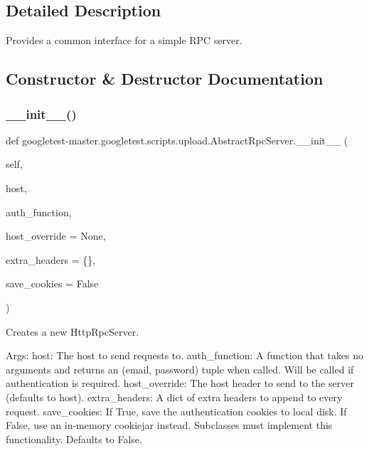 \subsection{Detailed Description}
\begin{DoxyVerb}Provides a common interface for a simple RPC server.\end{DoxyVerb}
 

\subsection{Constructor \& Destructor Documentation}
\mbox{\label{classgoogletest-master_1_1googletest_1_1scripts_1_1upload_1_1_abstract_rpc_server_ab7c84aa7f8f377b98188c9120cfcc355}} 
\subsubsection{\texorpdfstring{\_\_init\_\_()}{\_\_init\_\_()}}
{\footnotesize\ttfamily def googletest-\/master.\+googletest.\+scripts.\+upload.\+Abstract\+Rpc\+Server.\+\_\+\+\_\+init\+\_\+\+\_\+ (\begin{DoxyParamCaption}\item[{}]{self,  }\item[{}]{host,  }\item[{}]{auth\+\_\+function,  }\item[{}]{host\+\_\+override = {\ttfamily None},  }\item[{}]{extra\+\_\+headers = {\ttfamily \{\}},  }\item[{}]{save\+\_\+cookies = {\ttfamily False} }\end{DoxyParamCaption})}

\begin{DoxyVerb}Creates a new HttpRpcServer.

Args:
  host: The host to send requests to.
  auth_function: A function that takes no arguments and returns an
(email, password) tuple when called. Will be called if authentication
is required.
  host_override: The host header to send to the server (defaults to host).
  extra_headers: A dict of extra headers to append to every request.
  save_cookies: If True, save the authentication cookies to local disk.
If False, use an in-memory cookiejar instead.  Subclasses must
implement this functionality.  Defaults to False.
\end{DoxyVerb}
 

